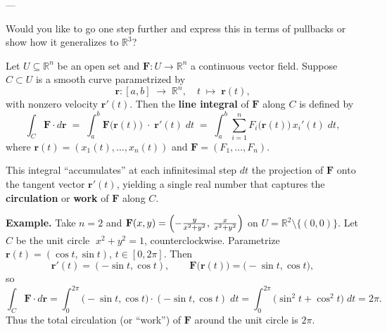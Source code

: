 \documentclass[11pt,openany]{article}
\renewcommand{\emph}[1]{\textbf{#1}}
\begin{document}
---

Would you like to go one step further and express this in terms of pullbacks or show how it generalizes to \( \mathbb{R}^3 \)?

\newpage
Let \(U\subseteq\mathbb{R}^n\) be an open set and 
\(\displaystyle\mathbf F:U\to\mathbb{R}^n\) a continuous vector field.  
Suppose \(C\subset U\) is a smooth curve parametrized by
\[
\mathbf r\colon [a,b]\;\longrightarrow\;\mathbb{R}^n,
\quad
t\;\mapsto\;\mathbf r(t),
\]
with nonzero velocity \(\mathbf r'(t)\).  Then the \emph{line integral} of \(\mathbf F\) along \(C\) is defined by
\[
\boxed{
	\int_C\mathbf F\!\cdot d\mathbf r
	\;=\;
	\int_a^b
	\mathbf F\bigl(\mathbf r(t)\bigr)\;\cdot\;\mathbf r'(t)\;dt
	\;=\;
	\int_a^b
	\sum_{i=1}^n F_i\bigl(\mathbf r(t)\bigr)\,x_i'(t)\;dt,
}
\]
where \(\mathbf r(t)=(x_1(t),\dots,x_n(t))\) and 
\(\mathbf F=(F_1,\dots,F_n)\).  

\medskip

\noindent
This integral “accumulates” at each infinitesimal step \(dt\) the projection of \(\mathbf F\) onto the tangent vector \(\mathbf r'(t)\), yielding a single real number that captures the \emph{circulation} or \emph{work} of \(\mathbf F\) along \(C\).

\bigskip

\noindent\textbf{Example.}  Take \(n=2\) and 
\(\displaystyle \mathbf F(x,y)
=\Bigl(-\tfrac{y}{x^2+y^2},\,\tfrac{x}{x^2+y^2}\Bigr)\)
on \(U=\mathbb{R}^2\setminus\{(0,0)\}\).  Let \(C\) be the unit circle 
\(\;x^2+y^2=1\), counterclockwise.  Parametrize
\(\mathbf r(t)=(\cos t,\sin t)\), \(t\in[0,2\pi]\).  Then
\[
\mathbf r'(t)=(-\sin t,\cos t),\qquad
\mathbf F\bigl(\mathbf r(t)\bigr)
=\bigl(-\sin t,\cos t\bigr),
\]
so
\[
\int_C\mathbf F\!\cdot d\mathbf r
=\int_0^{2\pi}
\bigl(-\sin t,\cos t\bigr)\cdot(-\sin t,\cos t)\;dt
=\int_0^{2\pi}
\bigl(\sin^2t+\cos^2t\bigr)\;dt
=2\pi.
\]
Thus the total circulation (or “work”) of \(\mathbf F\) around the unit circle is \(2\pi\).
\end{document}

